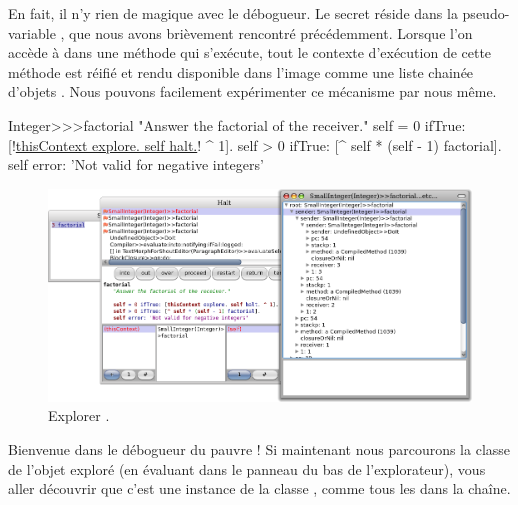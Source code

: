 \documentclass[a4paper,10pt,twoside]{book}
\begin{document}
En fait, il n'y rien de magique avec le débogueur.
Le secret réside dans la pseudo-variable , que nous avons brièvement rencontré précédemment.
Lorsque l'on accède à  dans une méthode qui s'exécute, tout le contexte d'exécution de cette méthode est réifié et rendu disponible dans l'image comme une liste chainée d'objets .
Nous pouvons facilement expérimenter ce mécanisme par nous même.

\begin{code}{}
Integer>>>factorial
	"Answer the factorial of the receiver."
	self = 0 ifTrue: [!\underline{thisContext explore. self halt.}! ^ 1].
	self > 0 ifTrue: [^ self * (self - 1) factorial].
	self error: 'Not valid for negative integers'
\end{code}


\begin{figure}[ht]\centering
	\includegraphics[width=\linewidth]{exploringThisContext}
	\caption{Explorer .}
\end{figure}

Bienvenue dans le débogueur du pauvre ! 
Si maintenant nous parcourons la classe de l'objet exploré (\ie en évaluant  dans le panneau du bas de l'explorateur), vous aller découvrir que c'est une instance de la classe , comme tous les  dans la chaîne.
\end{document}
